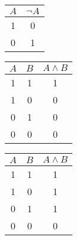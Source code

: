 { %
\captionsetup[table]{labelformat=empty, hypcap=false}

\begin{tcolorbox}[colframe=gray!80, colback=white, boxrule=0.4pt, top=4pt, bottom=4pt]
  \begin{minipage}[t]{0.32\textwidth}
    \centering
    \vspace{-10pt} %
    \vspace{3pt}  %
    \begin{tabular}{c|c}
      \(A\) & \(\neg A\) \\
      \hline
      1 & 0 \\
      0 & 1
    \end{tabular}
  \end{minipage}
  \hfill
  \begin{minipage}[t]{0.32\textwidth}
    \centering
    \vspace{-10pt}
    \vspace{3pt}
    \begin{tabular}{cc|c}
      \(A\) & \(B\) & \(A \land B\)\\
      \hline
      1 & 1 & 1 \\
      1 & 0 & 0 \\
      0 & 1 & 0 \\
      0 & 0 & 0 \\
    \end{tabular}
  \end{minipage}
  \hfill
  \begin{minipage}[t]{0.32\textwidth}
    \centering
    \vspace{-10pt}
    \vspace{3pt}
    \begin{tabular}{cc|c}
      \(A\) & \(B\) & \(A \land B\)\\
      \hline
      1 & 1 & 1 \\
      1 & 0 & 1 \\
      0 & 1 & 1 \\
      0 & 0 & 0 \\
    \end{tabular}
  \end{minipage}
\end{tcolorbox}
}

